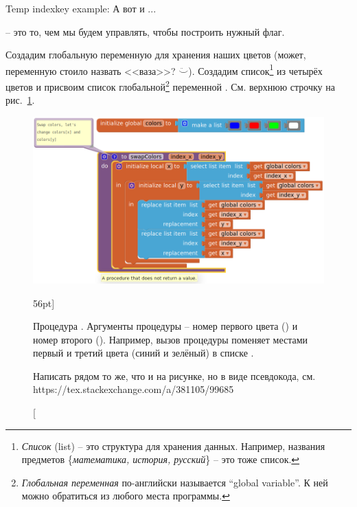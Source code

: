 Temp indexkey example: А вот и ...

 -- это то, чем мы будем управлять, 
чтобы построить нужный флаг. 

Создадим глобальную переменную  для хранения наших цветов 
(может, переменную стоило назвать <<ваза>>? $\ddot\smile$). 
Создадим список\footnote[][-2cm]{\emph{Список} (list) -- это структура для хранения данных. 
Например, названия предметов \{\emph{математика, история, русский}\} -- это тоже список.
} 
из четырёх цветов и присвоим список глобальной\footnote[][-0cm]{
    \emph{Глобальная переменная} по-английски 
    называется ``global variable''. К ней можно обратиться из любого места программы. 
    }
переменной . См. верхнюю строчку на рис.~\ref{fig:block:proc:swap:colors}.

\begin{figure}
  \includegraphics{./graphics/programs/change_flags/proc_swap_colors_2018.png}
    \caption[Процедура .][56pt]{Процедура .
    Аргументы процедуры -- номер первого цвета () 
    и номер второго (). 
    Например, вызов процедуры  поменяет местами первый и 
    третий цвета (синий и зелёный) в списке . 
    
    {\tiny Написать рядом то же, что и на рисунке, но в виде псевдокода, 
    см. https://tex.stackexchange.com/a/381105/99685
    }
    
    }
  \label{fig:block:proc:swap:colors}
\end{figure}

